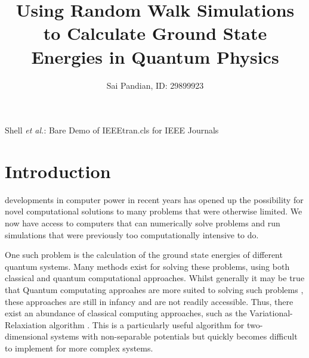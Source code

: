 \documentclass[journal]{IEEEtran}
\begin{document}
\title{Using Random Walk Simulations to Calculate Ground State Energies in Quantum Physics}

\author{Sai Pandian, ID: 29899923}%
        
{Shell \MakeLowercase{\textit{et al.}}: Bare Demo of IEEEtran.cls for IEEE Journals}

\maketitle

\begin{abstract}
\end{abstract}


\section{Introduction}
 developments in computer power in recent years has opened
up the possibility for novel computational solutions to many problems that were
otherwise limited. We now have access to computers that can numerically solve
problems and run simulations that were previously too computationally intensive
to do.

One such problem is the calculation of the ground state energies of different
quantum systems. Many methods exist for solving these problems, using both
classical and quantum computational approaches. Whilst generally it may be true
that Quantum computating approahes are more suited to solving such problems
\cite{Mazzola}, these approaches are still in infancy and are not readily
accessible. Thus, there exist an abundance of classical computing approaches,
such as the Variational-Relaxiation algorithm \cite{Schroeder2017}. This is a
particularly useful algorithm for two-dimensional systems with non-separable
potentials but quickly becomes difficult to implement for more complex systems.
\end{document}

